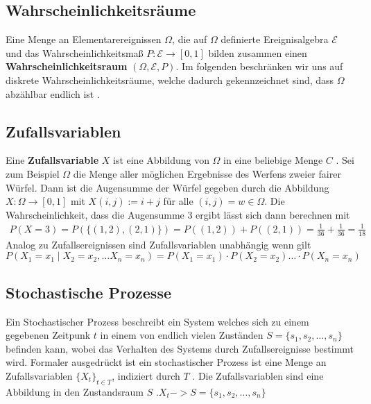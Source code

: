 \subsection{Wahrscheinlichkeitsräume}
Eine Menge an Elementarereignissen $\Omega$, die auf $\Omega$ definierte Ereignisalgebra $\mathcal{E}$ und das Wahrscheinlichkeitsmaß $P: \mathcal{E}\rightarrow [0,1]$ bilden zusammen einen \textbf{Wahrscheinlichkeitsraum} $(\Omega, \mathcal{E}, P)$. Im folgenden beschränken wir uns auf diskrete Wahrscheinlichkeitsräume, welche dadurch gekennzeichnet sind, dass $\Omega$ abzählbar endlich ist \cite{ElementareStochastic}.
\subsection{Zufallsvariablen}
Eine \textbf{Zufallsvariable} $X$ ist eine Abbildung von $\Omega$ in eine beliebige Menge $C$ \cite{ElementareStochastic}. Sei zum Beispiel $\Omega$ die Menge aller möglichen Ergebnisse des Werfens zweier fairer Würfel. Dann ist die Augensumme der Würfel gegeben durch die Abbildung $X: \Omega \rightarrow [0,1]$ mit $X(i, j) := i + j$ für alle $(i,j ) = w \in \Omega$. Die Wahrscheinlichkeit, dass die Augensumme 3 ergibt lässt sich dann berechnen mit
\begin{align*}
    P(X=3) = P(\{(1,2), (2,1)\}) = P((1,2)) + P((2,1)) = \frac{1}{36} + \frac{1}{36} = \frac{1}{18}
\end{align*}
Analog zu Zufallsereignissen sind Zufallsvariablen unabhängig wenn gilt
\begin{equation}
    P(X_1 = x_1 \mid X_2=x_2, \dots X_n=x_n) = P(X_1=x_1) \cdot P(X_2=x_2)  \dots \cdot P(X_n=x_n)
\end{equation}
\subsection{Stochastische Prozesse}
Ein Stochastischer Prozess beschreibt ein System welches sich zu einem gegebenen Zeitpunk $t$ in einem von endlich vielen Zuständen $S=\{s_1, s_2, \dots, s_n\}$ befinden kann, wobei das Verhalten des Systems durch Zufallsereignisse bestimmt wird. Formaler ausgedrückt ist ein stochastischer Prozess ist eine Menge an Zufallsvariablen $\{X_t\}_{t \in T}$, indiziert durch $T$ \cite*{StochasticProcesses}. Die Zufallsvariablen sind eine Abbildung in den Zustandsraum $S$ \cite{StochastischeProzesse}.$X_t -> S = \{s_1, s_2, \dots, s_n\}$